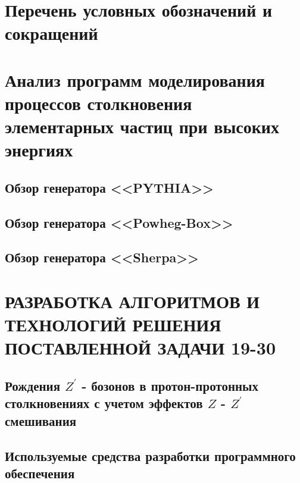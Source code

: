 \documentclass[12pt,a4paper]{styles/report}
\begin{document}
	
\renewcommand\contentsname{СОДЕРЖАНИЕ}
\renewcommand{\bibname}{БИБЛИОГРАФИЧЕСКИЙ СПИСОК}
\renewcommand\chaptername{ГЛАВА}
\renewcommand\figurename{Рисунок}
\renewcommand\tablename{Таблица}



\newpage
\pagestyle{plain}  \setcounter{page}{2}
\large \tableofcontents

\newpage
\chapter*{Перечень условных обозначений и сокращений}






\chapter{Анализ программ моделирования процессов столкновения элементарных частиц при высоких энергиях}

\section{Обзор генератора <<PYTHIA>>}
\section{Обзор генератора <<Powheg-Box>>}
\section{Обзор генератора <<Sherpa>>}

\chapter{РАЗРАБОТКА АЛГОРИТМОВ И ТЕХНОЛОГИЙ РЕШЕНИЯ ПОСТАВЛЕННОЙ ЗАДАЧИ 19-30}
\section{Рождения $Z^\prime$ - бозонов в протон-протонных столкновениях с учетом эффектов $Z$ - $Z^\prime$ смешивания}


\section{Используемые средства разработки программного обеспечения}
\end{document}
